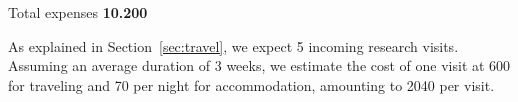 Total expenses \textbf{10.200 \texteuro}
\medskip

As explained in Section~\ref{sec:travel}, we expect 5 incoming research visits.  Assuming
an average duration of 3 weeks, we estimate the cost of one visit at 600 {\texteuro} for
traveling and 70 {\texteuro} per night for accommodation, amounting to 2040 \texteuro per
visit.




